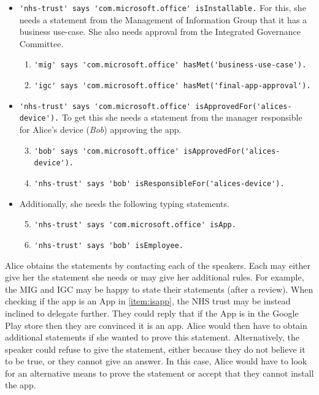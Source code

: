 \documentclass[thesis.tex]{subfiles}
\begin{document}
\begin{itemize}
  \item {\lstinline{'nhs-trust' says 'com.microsoft.office' isInstallable.}\newline}
    For this, she needs a statement from the Management of Information Group that it has a business use-case.
    She also needs approval from the Integrated Governance Committee.
    \begin{enumerate}\setcounter{enumi}{0}
      \item {\lstinline{'mig' says 'com.microsoft.office' hasMet('business-use-case').}}
      \item {\lstinline{'igc' says 'com.microsoft.office' hasMet('final-app-approval').}}
    \end{enumerate}
  \item {\lstinline{'nhs-trust' says 'com.microsoft.office' isApprovedFor('alices-device').}}
    To get this she needs a statement from the manager responsible for Alice's device (\emph{Bob}) approving the app.
    \begin{enumerate}\setcounter{enumi}{2}
      \item {\lstinline{'bob' says 'com.microsoft.office' isApprovedFor('alices-device').}}
      \item {\lstinline{'nhs-trust' says 'bob' isResponsibleFor('alices-device').}}
    \end{enumerate}
  \item Additionally, she needs the following typing statements.
    \begin{enumerate}\setcounter{enumi}{4}
      \item {\lstinline{'nhs-trust' says 'com.microsoft.office' isApp.}} \label{item:isapp}
      \item {\lstinline{'nhs-trust' says 'bob' isEmployee.}}
    \end{enumerate}
\end{itemize}

Alice obtains the statements by contacting each of the speakers. 
Each may either give her the statement she needs or may give her additional rules.
For example, the \ac{MIG} and \ac{IGC} may be happy to state their statements (after a review).
When checking if the app is an App in \autoref{item:isapp}, the NHS trust may be instead inclined to delegate further.
They could reply that if the App is in the Google Play store then they are convinced it is an app.
Alice would then have to obtain additional statements if she wanted to prove this statement.
Alternatively, the speaker could refuse to give the statement, either because they do not believe it to be true, or they cannot give an answer.
In this case, Alice would have to look for an alternative means to prove the statement or accept that they cannot install the app.
\end{document}
